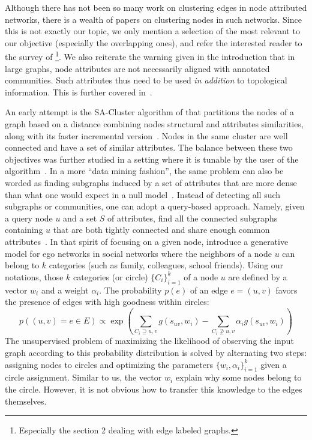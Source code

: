 \bigskip

Although there has not been so many work on clustering edges in node attributed networks, there is a
wealth of papers on clustering nodes in such networks. Since this is not exactly our topic, we only
mention a selection of the most relevant to our objective (especially the overlapping ones), and
refer the interested reader to the survey of
\textcite{surveyAttributedClustering15}\footnote{Especially the section 2 dealing with edge labeled
graphs.}. We also reiterate the warning given in the introduction that in large graphs, node
attributes are not necessarily aligned with annotated communities. Such attributes thus need to be
used \emph{in addition} to topological information. This is further covered in~\autocite[Section
3.4]{Fortunato2016}.

An early attempt is the \textsf{SA-Cluster} algorithm of \textcite{Zhou2009} that partitions the
nodes of a graph based on a distance combining nodes structural and attributes similarities, along
with its faster incremental version~\autocite{Zhou2010}. Nodes in the same cluster are well
connected and have a set of similar attributes. The balance between these two objectives was further
studied in a setting where it is tunable by the user of the algorithm~\textcite{Baroni2017}. In a
more \enquote{data mining fashion}, the same problem can also be worded as finding subgraphs induced
by a set of attributes that are more dense than what one would expect in a null
model~\autocite{Silva2012}. Instead of detecting all such subgraphs or communities, one can adopt a
query-based approach. Namely, given a query node $u$ and a set $S$ of attributes, find all the
connected subgraphs containing $u$ that are both tightly connected and share enough common
attributes~\autocite{AttributedCommunity16}. In that spirit of focusing on a given node,
\textcite{LeskovecEgo12} introduce a generative model for ego networks in social networks where the
neighbors of a node $u$ can belong to $k$ categories (such as family, colleagues, school friends).
Using our notations, those $k$ categories (or circle) $\{C_i\}_{i=1}^k$ of a node $u$ are defined by
a vector $w_i$ and a weight $\alpha_i$. The probability $p(e)$ of an edge $e=(u,v)$ favors the
presence of edges with high goodness within circles:
\begin{equation}
  \label{eq:edge_ego}
  p((u, v)=e \in E) \propto \exp \left(
    \sum_{C_i  \supseteq {u,v}} g(s_{uv}, w_i) -
    \sum_{C_i \nsupseteq {u,v}} \alpha_i g(s_{uv}, w_i)
  \right)%
\end{equation}
The unsupervised problem of maximizing the likelihood of observing the input graph according to this
probability distribution is solved by alternating two steps: assigning nodes to circles and
optimizing the parameters $\{w_i, \alpha_i\}_{i=1}^k$ given a circle assignment. Similar to us, the
vector $w_i$ explain why some nodes belong to the \ith{} circle. However, it is not obvious how to
transfer this knowledge to the edges themselves.

